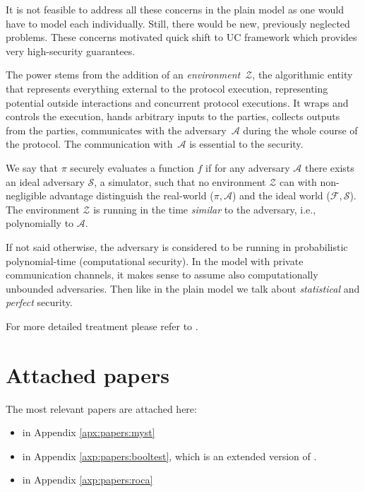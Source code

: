 \documentclass[
  digital, %
  twoside, %
  table,   %
  lof,     %
  lot,     %
]{fithesis3}
\newcounter{ph4_show_guides}
\theoremstyle{definition}
\theoremstyle{remark}
\begin{document}
It is not feasible to address all these concerns in the plain model as one would have to model each individually. Still, there would be new, previously neglected problems. These concerns motivated quick shift to UC framework which provides very high-security guarantees.

The power stems from the addition of an \emph{environment}~$\mathcal{Z}$, the algorithmic entity that represents everything external to the protocol execution, representing potential outside interactions and concurrent protocol executions. It wraps and controls the execution, hands arbitrary inputs to the parties, collects outputs from the parties, communicates with the adversary~$\mathcal{A}$ during the whole course of the protocol. The communication with~$\mathcal{A}$ is essential to the security.


We say that $\pi$ securely evaluates a function $f$ if for any adversary $\mathcal{A}$ there exists an ideal adversary $\mathcal{S}$, a simulator, such that no environment $\mathcal{Z}$ can with non-negligible advantage distinguish the real-world ($\pi, \mathcal{A}$) and the ideal world ($\mathcal{F}, \mathcal{S}$). The environment $\mathcal{Z}$ is running in the time \emph{similar} to the adversary, i.e., polynomially to $\mathcal{A}$.

If not said otherwise, the adversary is considered to be running in probabilistic polynomial-time (computational security). In the model with private communication channels, it makes sense to assume also computationally unbounded adversaries. Then like in the plain model we talk about \emph{statistical} and \emph{perfect} security.

For more detailed treatment please refer to \cite{Can01, CLOS02, Lin03, G09, CDN15, Lin17}.


\chapter{Attached papers}\label{apx:papers}
The most relevant papers are attached here: 


\begin{itemize}
	\item {} \cite{2017-ccs-mavroudis} in Appendix \ref{apx:papers:myst}
	
	\item {} \cite{booltest2} in Appendix \ref{axp:papers:booltest}, which is an extended version of \cite{booltest_secrypt2017}.
	
	\item {} \cite{2017-ccs-nemec} in Appendix \ref{axp:papers:roca}
\end{itemize}
 
\end{document}
